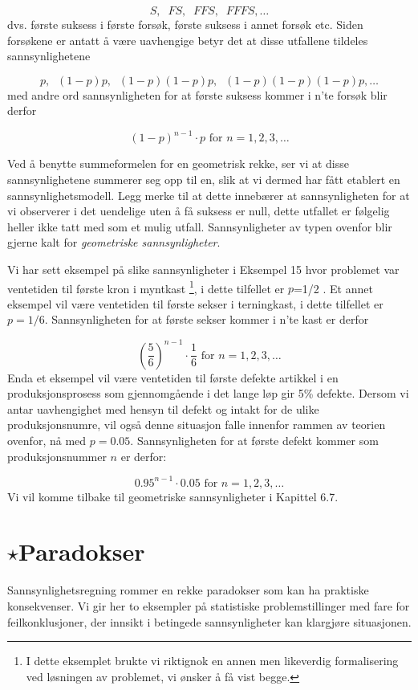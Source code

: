 \[ S,\;\; FS,\;\; FFS,\;\; FFFS, \ldots \]
dvs. første suksess i første forsøk, første suksess i annet
forsøk etc. Siden forsøkene er antatt å være uavhengige betyr det
at disse utfallene tildeles sannsynlighetene

\[ p,\;\; (1-p)p,\;\; (1-p)(1-p)p,\;\; (1-p)(1-p)(1-p)p, \ldots  \]
med andre ord sannsynligheten for at første suksess kommer i n'te
forsøk blir derfor

\[   (1-p)^{n-1} \cdot p   \mbox{\ \ \ for \ \ } n=1,2,3, \ldots  \]

\noindent Ved å benytte summeformelen for en geometrisk rekke, ser vi at
disse sannsynlighetene summerer seg opp til en, slik at vi dermed
har fått etablert en sannsynlighetsmodell. Legg merke til at
dette innebærer at sannsynligheten for at vi observerer i det
uendelige uten å få suksess er null, dette utfallet er følgelig
heller ikke tatt med som et mulig utfall. Sannsynligheter av
typen ovenfor blir gjerne kalt for {\em geometriske sannsynligheter}.

Vi har sett eksempel på slike sannsynligheter i Eksempel 15 hvor
problemet var ventetiden til første kron i myntkast
 \footnote{I dette eksemplet brukte vi riktignok en annen men likeverdig
formalisering ved løsningen av problemet, vi ønsker å få vist
begge.}, i dette tilfellet er  $p$=1/2 . Et annet eksempel vil
være ventetiden til første sekser i terningkast, i dette
tilfellet er $p=1/6$. Sannsynligheten for at første sekser kommer
i n'te kast er derfor

\[ {(\frac{5}{6})}^{n-1} \cdot \frac{1}{6} 
                            \mbox{\ \ \ for \ \  } n=1,2,3, \ldots  \]
Enda et eksempel vil være ventetiden til første defekte artikkel
i en produksjonsprosess som gjennomgående i det lange løp gir 5\%
defekte. Dersom vi antar uavhengighet med hensyn til defekt og
intakt for de ulike produksjonsnumre, vil også denne situasjon
falle innenfor rammen av teorien ovenfor, nå med $p=0.05$.
Sannsynligheten for at første defekt kommer som produksjonsnummer
$n$ er derfor:

\[  0.95^{n-1} \cdot 0.05   \mbox{\ \  for \ \  } n=1,2,3, \ldots  \]
Vi vil komme tilbake til geometriske sannsynligheter i Kapittel 6.7.
               
\section{$\star$Paradokser}
\small
Sannsynlighetsregning rommer en rekke paradokser som kan ha
praktiske konsekvenser. Vi gir her to eksempler
på statistiske problemstillinger med fare for feilkonklusjoner,
der innsikt i betingede sannsynligheter kan klargjøre situasjonen.\\

